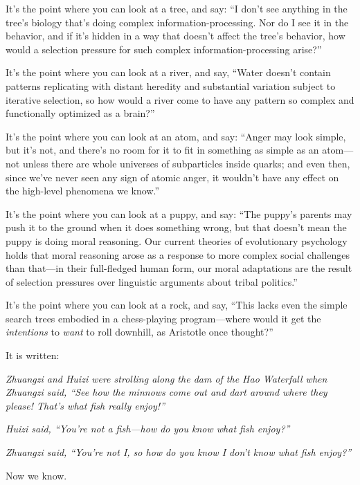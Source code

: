 {
 It's the point where you can look at a tree, and
say: ``I don't see anything in the
tree's biology that's doing complex
information-processing. Nor do I see it in the behavior, and if
it's hidden in a way that doesn't
affect the tree's behavior, how would a selection
pressure for such complex information-processing
arise?''}

{
 It's the point where you can look at a river, and
say, ``Water doesn't contain patterns
replicating with distant heredity and substantial variation subject to
iterative selection, so how would a river come to have any pattern so
complex and functionally optimized as a brain?''}

{
 It's the point where you can look at an atom, and
say: ``Anger may look simple, but it's
not, and there's no room for it to fit in something as
simple as an atom---not unless there are whole universes of
subparticles inside quarks; and even then, since we've
never seen any sign of atomic anger, it wouldn't have
any effect on the high-level phenomena we know.''}

{
 It's the point where you can look at a puppy, and
say: ``The puppy's parents may push it
to the ground when it does something wrong, but that
doesn't mean the puppy is doing moral reasoning. Our
current theories of evolutionary psychology holds that moral reasoning
arose as a response to more complex social challenges than that---in
their full-fledged human form, our moral adaptations are the result of
selection pressures over linguistic arguments about tribal
politics.''}

{
 It's the point where you can look at a rock, and
say, ``This lacks even the simple search trees
embodied in a chess-playing program---where would it get the
\textit{intentions} to \textit{want} to roll downhill, as Aristotle
once thought?''}

{
 It is written:}

{
 \textit{Zhuangzi and Huizi were strolling along the dam of the Hao
Waterfall when Zhuangzi said, ``See how the minnows
come out and dart around where they please! That's what
fish really enjoy!''}}

{
 \textit{Huizi said, ``You're not
a fish---how do you know what fish enjoy?''}}

{
 \textit{Zhuangzi said, ``You're
not I, so how do you know I don't know what fish
enjoy?''}}

{
 Now we know.}

\myendsectiontext


